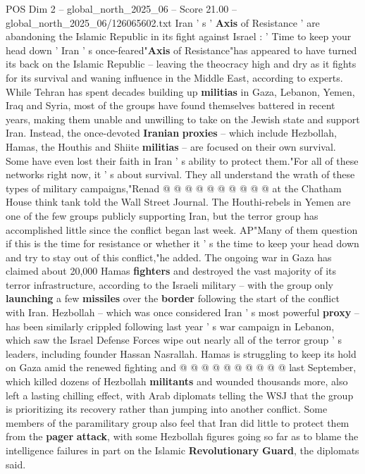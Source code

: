 \begin{textsample}{POS Dim 2 – global\_north\_2025\_06 – Score 21.00 – global\_north\_2025\_06/126065602.txt}  \label{ex:f2_pos_360}
Iran ' s ' \textbf{Axis} of Resistance ' are abandoning the Islamic Republic in its fight against Israel : ' Time to keep your head down ' Iran ' s once-feared"\textbf{Axis} of Resistance"has appeared to have turned its back on the Islamic Republic -- leaving the theocracy high and dry as it fights for its survival and waning influence in the Middle East, according to experts.
While Tehran has spent decades building up \textbf{militias} in Gaza, Lebanon, Yemen, Iraq and Syria, most of the groups have found themselves battered in recent years, making them unable and unwilling to take on the Jewish state and support Iran.
Instead, the once-devoted \textbf{Iranian} \textbf{proxies} -- which include Hezbollah, Hamas, the Houthis and Shiite \textbf{militias} -- are focused on their own survival.
Some have even lost their faith in Iran ' s ability to protect them."For all of these networks right now, it ' s about survival.
They all understand the wrath of these types of military campaigns,"Renad @ @ @ @ @ @ @ @ @ @ at the Chatham House think tank told the Wall Street Journal.
The Houthi-rebels in Yemen are one of the few groups publicly supporting Iran, but the terror group has accomplished little since the conflict began last week.
AP"Many of them question if this is the time for resistance or whether it ' s the time to keep your head down and try to stay out of this conflict,"he added.
The ongoing war in Gaza has claimed about 20,000 Hamas \textbf{fighters} and destroyed the vast majority of its terror infrastructure, according to the Israeli military -- with the group only \textbf{launching} a few \textbf{missiles} over the \textbf{border} following the start of the conflict with Iran.
Hezbollah -- which was once considered Iran ' s most powerful \textbf{proxy} -- has been similarly crippled following last year ' s war campaign in Lebanon, which saw the Israel Defense Forces wipe out nearly all of the terror group ' s leaders, including founder Hassan Nasrallah.
Hamas is struggling to keep its hold on Gaza amid the renewed fighting and @ @ @ @ @ @ @ @ @ @ last September, which killed dozens of Hezbollah \textbf{militants} and wounded thousands more, also left a lasting chilling effect, with Arab diplomats telling the WSJ that the group is prioritizing its recovery rather than jumping into another conflict.
Some members of the paramilitary group also feel that Iran did little to protect them from the \textbf{pager} \textbf{attack}, with some Hezbollah figures going so far as to blame the intelligence failures in part on the Islamic \textbf{Revolutionary} \textbf{Guard}, the diplomats said.

\end{textsample}
